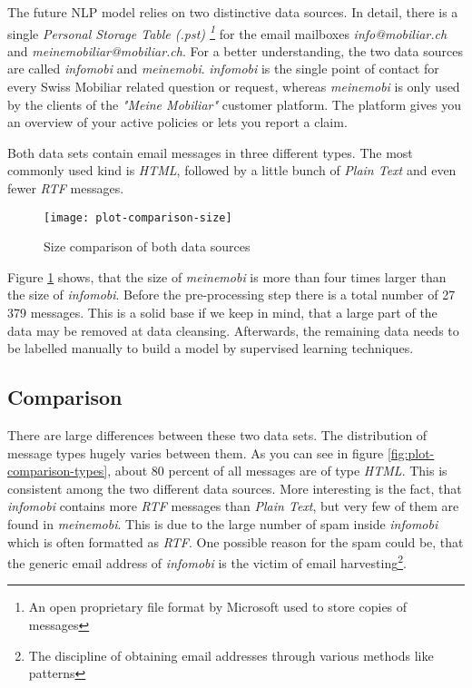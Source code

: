 The future NLP model relies on two distinctive data sources. In detail, there is a single \emph{Personal Storage Table (.pst)
\footnote{An open proprietary file format by Microsoft used to store copies of messages}} for the email mailboxes
\emph{info@mobiliar.ch} and \emph{meinemobiliar@mobiliar.ch}. For a better understanding, the two data sources are called
\emph{\gls{infomobi}} and \emph{\gls{meinemobi}}. \emph{infomobi} is the single point of contact for every Swiss Mobiliar
related question or request, whereas \emph{meinemobi} is only used by the clients of the \emph{"Meine Mobiliar"} customer platform.
The platform gives you an overview of your active policies or lets you report a claim.

Both data sets contain email messages in three different types. The most commonly used kind is \emph{HTML}, followed by
a little bunch of \emph{Plain Text} and even fewer \emph{RTF} messages.

\begin{figure}[!ht]
    \centering
    \texttt{[image: plot-comparison-size]}
    \caption{Size comparison of both data sources}
    \label{fig:plot-comparison-size}
\end{figure}

Figure \ref{fig:plot-comparison-size} shows, that the size of \emph{meinemobi} is more than four times larger than the size
of \emph{infomobi}. Before the pre-processing step there is a total number of 27 379 messages. This is a solid base if we
keep in mind, that a large part of the data may be removed at data cleansing. Afterwards, the remaining data needs to be
labelled manually to build a model by supervised learning techniques.

\subsection{Comparison}

There are large differences between these two data sets. The distribution of message types hugely varies between them.
As you can see in figure \ref{fig:plot-comparison-types}, about 80 percent of all messages are of type \emph{HTML}.
This is consistent among the two different data sources. More interesting is the fact, that \emph{infomobi} contains
more \emph{RTF} messages than \emph{Plain Text}, but very few of them are found in \emph{meinemobi}. This is due to
the large number of spam inside \emph{infomobi} which is often formatted as \emph{RTF}. One possible reason for the spam could be,
that the generic email address of \emph{infomobi} is the victim of email harvesting\footnote{The discipline of obtaining email
addresses through various methods like patterns}.

